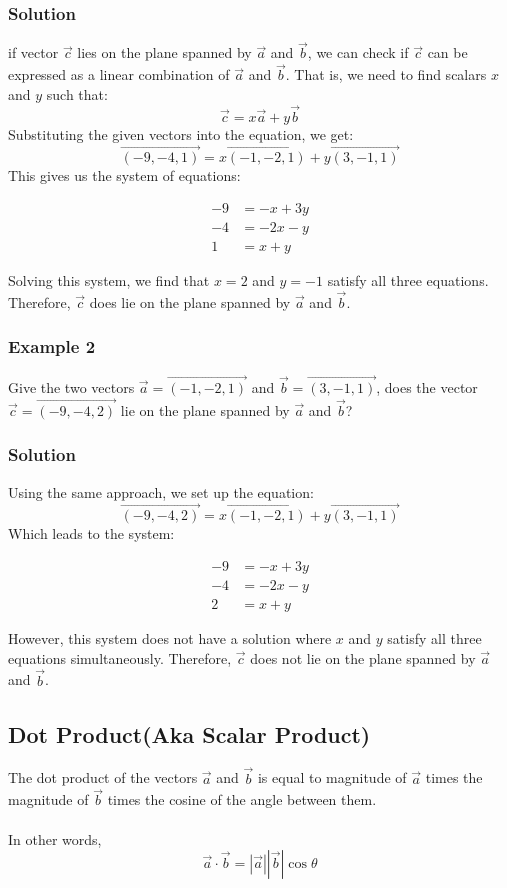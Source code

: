 \documentclass{article}
\begin{document}
\subsubsection*{Solution}
 if vector $\vec{c}$ lies on the plane spanned by $\vec{a}$ and $\vec{b}$, we can check if $\vec{c}$ can be expressed as a linear combination of $\vec{a}$ and $\vec{b}$. That is, we need to find scalars $x$ and $y$ such that:
\[
\vec{c} = x\vec{a} + y\vec{b}
\]
Substituting the given vectors into the equation, we get:
\[
\overrightarrow{(-9,-4,1)} = x\overrightarrow{(-1,-2,1)} + y\overrightarrow{(3,-1,1)}
\]
This gives us the system of equations:

\begin{align*}
-9 &= -x + 3y \\
-4 &= -2x - y \\
1 &= x + y
\end{align*}

Solving this system, we find that $x = 2$ and $y = -1$ satisfy all three equations. Therefore, $\vec{c}$ does lie on the plane spanned by $\vec{a}$ and $\vec{b}$.


\subsubsection{Example 2}
Give the two vectors $\vec{a}=\overrightarrow{(-1,-2,1)}$ and $\vec{b}=\overrightarrow{(3,-1,1)}$, does the vector $\vec{c}=\overrightarrow{(-9,-4,2)}$ lie on the plane spanned by $\vec{a}$ and $\vec{b}$?
\subsubsection*{Solution }
Using the same approach, we set up the equation:
\[
\overrightarrow{(-9,-4,2)} = x\overrightarrow{(-1,-2,1)} + y\overrightarrow{(3,-1,1)}
\]
Which leads to the system:

\begin{align*}
-9 &= -x + 3y \\
-4 &= -2x - y \\
2 &= x + y
\end{align*}

However, this system does not have a solution where $x$ and $y$ satisfy all three equations simultaneously. Therefore, $\vec{c}$ does not lie on the plane spanned by $\vec{a}$ and $\vec{b}$.

\subsection{Dot Product(Aka Scalar Product)}
The dot product of the vectors $\vec{a}$ and $\vec{b}$ is equal to magnitude of $\vec{a}$ times the magnitude of $\vec{b}$ times the cosine of the angle between them.\\\\
In other words,
\[\vec{a}\cdot \vec{b}=|\vec{a}||\vec{b}|\cos \theta\]
\end{document}
